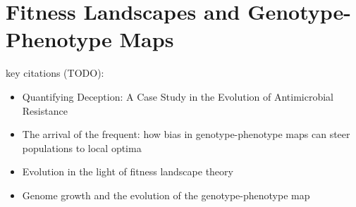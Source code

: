 \section{Fitness Landscapes and Genotype-Phenotype Maps}
\label{sec:fitness-landscape}

key citations (TODO):
\begin{itemize}
  \item Quantifying Deception: A Case Study in the Evolution of Antimicrobial Resistance \citep{eppstein2016quantifying}
  \item The arrival of the frequent: how bias in genotype-phenotype maps can steer populations to local optima \citep{schaper2014arrival}
  \item Evolution in the light of fitness landscape theory \citep{fragata2019evolution}
  \item Genome growth and the evolution of the genotype-phenotype map \citep{altenberg1995genome}
\end{itemize}
